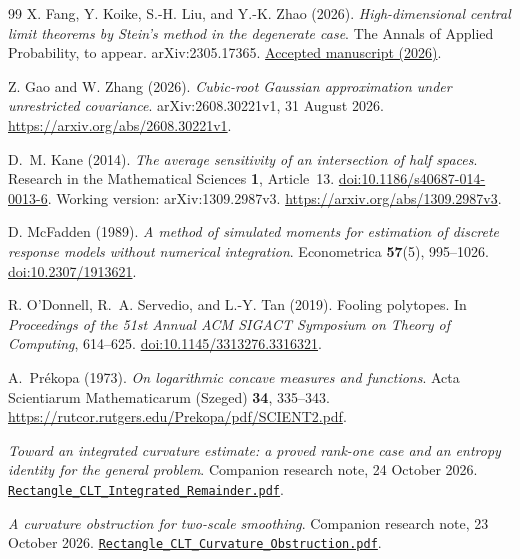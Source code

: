 \documentclass[11pt,letterpaper]{article}
\theoremstyle{remark}
\begin{document}
\begin{thebibliography}{99}
X. Fang, Y. Koike, S.-H. Liu, and Y.-K. Zhao (2026).
\emph{High-dimensional central limit theorems by Stein's method in
the degenerate case}. The Annals of Applied Probability, to appear.
arXiv:2305.17365.
\href{https://research.cuhk.edu.hk/en/publications/high-dimensional-central-limit-theorems-by-steins-method-in-the-d/}{Accepted manuscript (2026)}.

Z. Gao and W. Zhang (2026).
\emph{Cubic-root Gaussian approximation under unrestricted covariance}.
arXiv:2608.30221v1, 31 August 2026.
\url{https://arxiv.org/abs/2608.30221v1}.

D.~M. Kane (2014).
\emph{The average sensitivity of an intersection of half spaces}.
Research in the Mathematical Sciences \textbf{1}, Article~13.
\href{https://doi.org/10.1186/s40687-014-0013-6}{doi:10.1186/s40687-014-0013-6}.
Working version: arXiv:1309.2987v3.
\url{https://arxiv.org/abs/1309.2987v3}.

D. McFadden (1989).
\emph{A method of simulated moments for estimation of discrete
response models without numerical integration}.
Econometrica \textbf{57}(5), 995--1026.
\href{https://doi.org/10.2307/1913621}{doi:10.2307/1913621}.

R. O'Donnell, R.~A. Servedio, and L.-Y. Tan (2019).
Fooling polytopes.
In \emph{Proceedings of the 51st Annual ACM SIGACT Symposium on
Theory of Computing}, 614--625.
\href{https://doi.org/10.1145/3313276.3316321}{doi:10.1145/3313276.3316321}.

A.~Pr\'ekopa (1973).
\emph{On logarithmic concave measures and functions}.
Acta Scientiarum Mathematicarum (Szeged) \textbf{34}, 335--343.
\url{https://rutcor.rutgers.edu/Prekopa/pdf/SCIENT2.pdf}.

\emph{Toward an integrated curvature estimate: a proved rank-one case
and an entropy identity for the general problem}.
Companion research note, 24 October 2026.
\href{https://github.com/VC2015/HDCLTs/blob/main/research-rectangle-clt-singular/Rectangle_CLT_Integrated_Remainder.pdf}{\nolinkurl{Rectangle_CLT_Integrated_Remainder.pdf}}.

\emph{A curvature obstruction for two-scale smoothing}.
Companion research note, 23 October 2026.
\href{https://github.com/VC2015/HDCLTs/blob/main/research-rectangle-clt-singular/Rectangle_CLT_Curvature_Obstruction.pdf}{\nolinkurl{Rectangle_CLT_Curvature_Obstruction.pdf}}.


\end{thebibliography}
\end{document}
